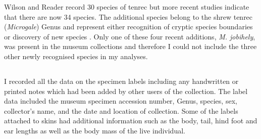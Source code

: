 Wilson and Reader \citeyearpar{Wilson2005} record 30 species of tenrec but more recent studies indicate that there are now 34 species\citep{Olson2013}. The additional species belong to the shrew tenrec (\textit{Microgale}) Genus and represent either recognition of cryptic species boundaries \citep{Olson2004} or discovery of new species \citep{Goodman2006, Olson2009}. Only one of these four recent additions, \textit{M. jobihely}, was present in the museum collections and therefore I could not include the three other newly recognised species in my analyses.




\subsection{} %

	I recorded all the data on the specimen labels including any handwritten or printed notes which had been added by other users of the collection. The label data included the museum specimen accession number, Genus, species, sex, collector's name, and the date and location of collection. Some of the labels attached to skins had additional information such as the body, tail, hind foot and ear lengths as well as the body mass of the live individual. 
	


  
\subsection{} 
\label{sect:measurements} %


